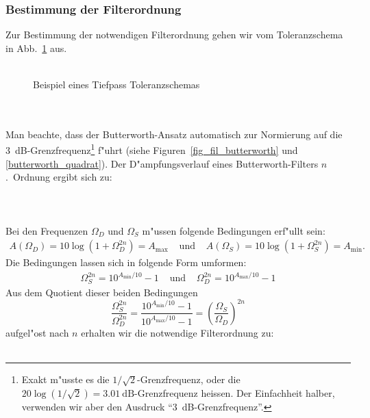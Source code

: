 \subsubsection{Bestimmung der Filterordnung}
Zur Bestimmung der notwendigen Filterordnung gehen wir vom
Toleranzschema in Abb.~\ref{tptol} aus.\\~~\\
\begin{figure}[!htb]
\vspace*{-3mm}
\begin{center}
  \caption{Beispiel eines Tiefpass Toleranzschemas \label{tptol}}
\end{center}
\vspace*{-6mm}
\end{figure}\\~~\\
\nit Man beachte, dass der Butterworth-Ansatz automatisch
zur Normierung auf die 3~dB-Grenz\-frequenz\footnote{Exakt m"usste es die $1/\sqrt{2}$-Grenz\-frequenz, oder die $20\log{(1/\sqrt{2})}=3.01~\text{dB}$-Grenz\-frequenz heissen. Der Einfachheit halber, verwenden wir aber den Ausdruck ``3~dB-Grenz\-frequenz''.} f"uhrt (siehe Figuren~\ref{fig_fil_butterworth} und \ref{butterworth_quadrat}). Der
D"ampfungsverlauf eines Butterworth-Filters $n$.~Ordnung ergibt sich
zu:\\~~\\
\\~~\\
\nit Bei den Frequenzen $\Omega_{D}$ und $\Omega_{S}$ m"ussen folgende Bedingungen 
erf"ullt sein:
\begin{eqnarray*}
A(\Omega_{D})=10\log{(1+\Omega_{D}^{2n})}=A_{\max} &\text{ und }& A(\Omega_{S})=10\log{(1+\Omega_{S}^{2n})}=A_{\min}.
\end{eqnarray*}
Die Bedingungen lassen sich in folgende Form umformen:
\begin{eqnarray*}
\Omega_{S}^{2n}=10^{A_{\min}/10}-1 &\text{ und }&\Omega_{D}^{2n}=10^{A_{\max}/10}-1
\end{eqnarray*}
Aus dem Quotient dieser beiden Bedingungen 
\[
\frac{\Omega_{S}^{2n}}{\Omega_{D}^{2n}}=\frac{10^{A_{\min}/10}-1}
{10^{A_{\max}/10}-1}=\left(\frac{\Omega_{S}}{\Omega_{D}}\right)^{2n}
\]
aufgel"ost nach $n$ erhalten wir die notwendige Filterordnung zu:\\~~\\
